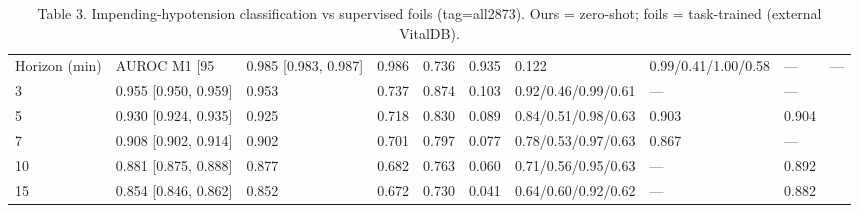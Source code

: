 \begin{table}[t]\centering\footnotesize
\caption{Table 3. Impending-hypotension classification vs supervised foils (tag=all2873). Ours = zero-shot; foils = task-trained (external VitalDB).}
\begin{tabular}{lllllllll}
\toprule
Horizon (min) & AUROC M1 [95%
 & 0.985 [0.983, 0.987] & 0.986 & 0.736 & 0.935 & 0.122 & 0.99/0.41/1.00/0.58 & — & — \\
3 & 0.955 [0.950, 0.959] & 0.953 & 0.737 & 0.874 & 0.103 & 0.92/0.46/0.99/0.61 & — & — \\
5 & 0.930 [0.924, 0.935] & 0.925 & 0.718 & 0.830 & 0.089 & 0.84/0.51/0.98/0.63 & 0.903 & 0.904 \\
7 & 0.908 [0.902, 0.914] & 0.902 & 0.701 & 0.797 & 0.077 & 0.78/0.53/0.97/0.63 & 0.867 & — \\
10 & 0.881 [0.875, 0.888] & 0.877 & 0.682 & 0.763 & 0.060 & 0.71/0.56/0.95/0.63 & — & 0.892 \\
15 & 0.854 [0.846, 0.862] & 0.852 & 0.672 & 0.730 & 0.041 & 0.64/0.60/0.92/0.62 & — & 0.882 \\
\bottomrule
\end{tabular}
\end{table}
